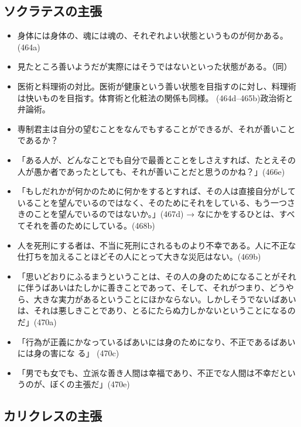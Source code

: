 \documentclass[dvipdfmx]{bxjsarticle}
\begin{document}
\subsection{ソクラテスの主張}
\begin{itemize}
\item 身体には身体の、魂には魂の、それぞれよい状態というものが何かある。(464a)

\item   見たところ善いようだが実際にはそうではないといった状態がある。（同）

\item 医術と料理術の対比。医術が健康という善い状態を目指すのに対し、料理術は快いものを目指す。体育術と化粧法の関係も同様。 (464d--465b)政治術と弁論術。

\item   専制君主は自分の望むことをなんでもすることができるが、それが善いことであるか？

\item 「ある人が、どんなことでも自分で最善とことをしさえすれば、たとえその人が愚か者であったとしても、それが善いことだと思うのかね？」(466e)

\item 「もしだれかが何かのために何かをするとすれば、その人は直接自分がしていることを望んでいるのではなく、そのためにそれをしている、もう一つさきのことを望んでいるのではないか。」(467d) → なにかをするひとは、すべてそれを善のためにしている。(468b)

\item 人を死刑にする者は、不当に死刑にされるものより不幸である。人に不正な仕打ちを加えることほどその人にとって大きな災厄はない。(469b)

\item 「思いどおりにふるまうということは、その人の身のためになることがそれに伴うばあいはたしかに善きことであって、そして、それがつまり、どうやら、大きな実力があるということにほかならない。しかしそうでないばあいは、それは悪しきことであり、とるにたらぬ力しかないということになるのだ」(470a)

\item   「行為が正義にかなっているばあいには身のためになり、不正であるばあいには身の害にな
  る」 (470c)

\item 「男でも女でも、立派な善き人間は幸福であり、不正でな人間は不幸だというのが、ぼくの主張だ」(470e)
\end{itemize}


\subsection{カリクレスの主張}
\end{document}
